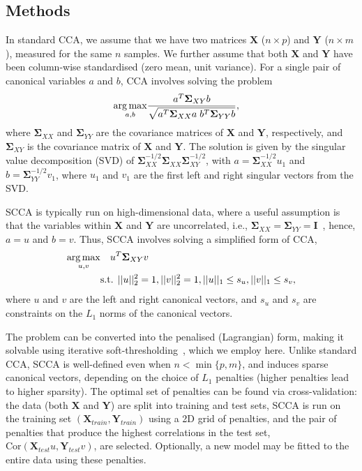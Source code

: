 \documentclass{bioinfo}
\DeclareMathOperator*{\argmax}{arg\,max}
\newcommand{\s}{\mathbf{\Sigma}}
\begin{document}
\vspace*{-12pt}
\begin{methods}
\section{Methods}

In standard CCA, we assume that we have two matrices $\mathbf{X}$ ($n \times p$)
and $\mathbf{Y}$ ($n \times m$), measured for the same $n$ samples.
We further assume that both $\mathbf{X}$ and $\mathbf{Y}$ have been
column-wise standardised (zero mean, unit variance).  For a single pair of 
canonical variables $a$ and $b$, CCA involves solving the problem
\vspace*{-10pt}
\begin{align}
\argmax_{a,b} & \frac{a^T \s_{XY} b}{\sqrt{a^T \s_{XX} a \; b^T \s_{YY} b}},
\label{eqn:cca}
\vspace*{-10pt}
\end{align}
where $\s_{XX}$ and $\s_{YY}$ are the covariance matrices of
$\mathbf{X}$ and $\mathbf{Y}$, respectively, and $\s_{XY}$ is the
covariance matrix of $\mathbf{X}$ and $\mathbf{Y}$. The solution is given by
the singular value decomposition (SVD) of $\s_{XX}^{-1/2} \s_{XX}
\s_{XY}^{-1/2}$, with $a = \s_{XX}^{-1/2} u_1$ and $b =
\s_{YY}^{-1/2} v_1$, where $u_1$ and $v_1$ are the first left and right
singular vectors from the SVD.

SCCA is typically run on high-dimensional data, where a useful assumption is that
the variables within $\mathbf{X}$ and $\mathbf{Y}$ are uncorrelated,
i.e., $\s_{XX}=\s_{YY}=\mathbf{I}$~\citep{Parkhomenko2009},
hence, $a = u$ and $b = v$. Thus, SCCA involves solving a simplified form of CCA,
\begin{align}
\argmax_{u,v} &  \quad u^T \s_{XY} v \notag \\
 & \mbox{s.t. } ||u||_2^2=1, ||v||_2^2 = 1, ||u||_1 \le s_u, ||v||_1 \le s_v,
\label{eqn:scca}\vspace*{-10pt}
\end{align}
where $u$ and $v$ are the left and right canonical vectors, 
and $s_u$ and $s_v$ are constraints on the $L_1$ norms
of the canonical vectors.

The problem can be converted into the penalised (Lagrangian) form, making it
solvable using iterative soft-thresholding~\citep{Parkhomenko2009}, which we
employ here.  Unlike standard CCA, SCCA is well-defined even when $n{<}\min
\{p, m\}$, and induces sparse canonical vectors, depending on the choice of
$L_1$ penalties (higher penalties lead to higher sparsity). The optimal set
of penalties can be found via cross-validation: the data (both $\mathbf{X}$
and $\mathbf{Y}$) are split into training and test sets, SCCA is run on the
training set $(\mathbf{X}_{train}, \mathbf{Y}_{train})$ using a 2D grid of
penalties, and the pair of penalties that produce the highest correlations
in the test set, $\mbox{Cor}(\mathbf{X}_{test} u, \mathbf{Y}_{test} v)$,
are selected.  Optionally, a new model may be fitted to the entire data
using these penalties.


\end{methods}
\end{document}
